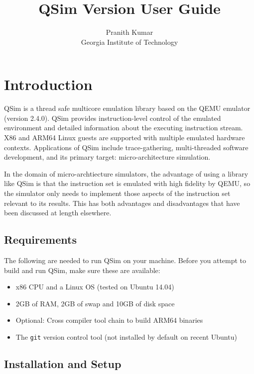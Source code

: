 \documentclass[letterpaper, 10pt]{book}
\title{QSim Version \version User Guide}
\author{Pranith Kumar\\ Georgia Institute of Technology}
\begin{document}
\maketitle

\setcounter{tocdepth}{1}
\tableofcontents

\chapter*{Introduction}
QSim is a thread safe multicore emulation library based on the QEMU emulator
(version 2.4.0).  QSim provides instruction-level control of the emulated
environment and detailed information about the executing instruction
stream. X86 and ARM64 Linux guests are supported with multiple emulated hardware
contexts. Applications of QSim include trace-gathering, multi-threaded software
development, and its primary target: micro-architecture simulation.

In the domain of micro-archtiecture simulators, the advantage of using a library
like QSim is that the instruction set is emulated with high fidelity by QEMU, so
the simulator only needs to implement those aspects of the instruction set
relevant to its results. This has both advantages and disadvantages that have
been discussed at length elsewhere.


\section{Requirements}
The following are needed to run QSim on your machine. Before you attempt to
build and run QSim, make sure these are available:

\begin{itemize}
  \item{x86 CPU and a Linux OS (tested on Ubuntu 14.04)}
  \item{2GB of RAM, 2GB of swap and 10GB of disk space}
  \item{Optional: Cross compiler tool chain to build ARM64 binaries}
  \item{The \texttt{git} version control tool (not installed by default on recent Ubuntu)}
\end{itemize}

\section{Installation and Setup}
\end{document}

